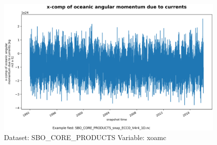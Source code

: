 \begin{figure}[H]
\centering
\includegraphics[width=\textwidth]{../images/plots/oneD_plots/SBO_Core_Products/xoamc.png}
\caption{Dataset: SBO\_CORE\_PRODUCTS Variable: xoamc}
\label{tab:table-SBO_CORE_PRODUCTS_xoamc-Plot}
\end{figure}
\pagebreak
